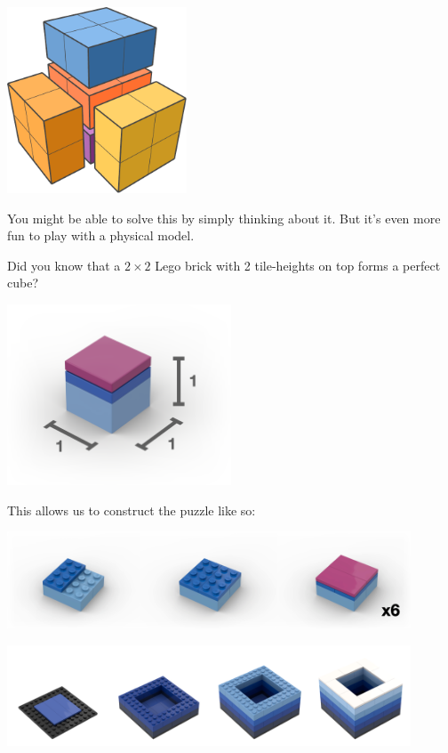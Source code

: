 \documentclass[
]{article}
\begin{document}
\begin{center}\includegraphics[width=0.4\textwidth,height=\textheight]{img/img3.pdf}\end{center}

You might be able to solve this by simply thinking about it. But it's
even more fun to play with a physical model.

Did you know that a \(2\times 2\) Lego brick with 2 tile-heights on top
forms a perfect cube?

\begin{center}\includegraphics[width=0.5\textwidth,height=\textheight]{img/annotated_lego_cube.png}\end{center}

This allows us to construct the puzzle like so:

\begin{center}\includegraphics[width=0.9\textwidth,height=\textheight]{img/piece_steps2.png}\end{center}
\begin{center}\includegraphics[width=0.9\textwidth,height=\textheight]{img/puzzle_box_steps.png}\end{center}
\end{document}
